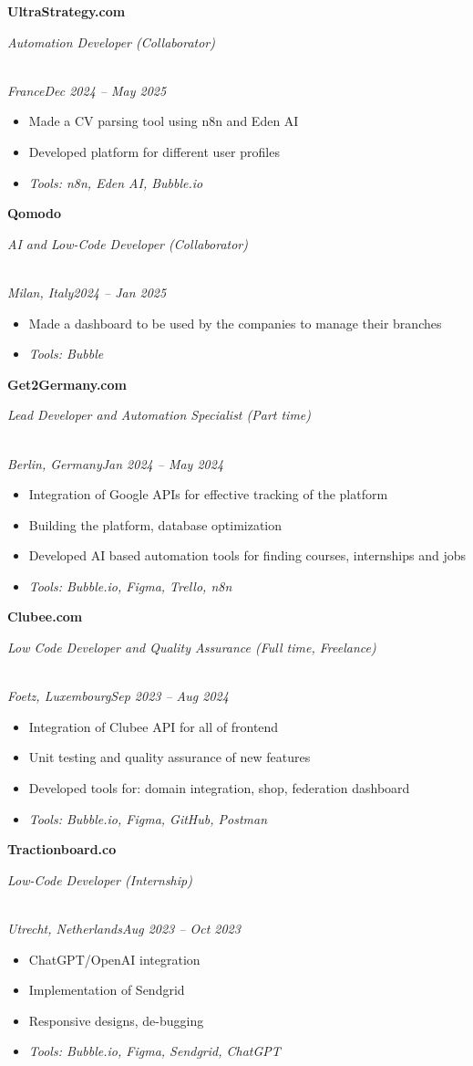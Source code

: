 \documentclass[a4paper,10pt]{article}
\newcommand{\role}[4]{\vspace{3pt}\noindent\hspace{0.6em}\parbox[t]{0.38\textwidth}{\raggedright\textbf{#1}}\hfill\parbox[t]{0.58\textwidth}{\raggedleft\textit{#2}}\\{\textit{#3}\hfill\textit{#4}}\vspace{1pt}}
\begin{document}
\role{UltraStrategy.com}{Automation Developer (Collaborator)}{France}{Dec 2024 -- May 2025}
\begin{itemize}
\item Made a CV parsing tool using n8n and Eden AI
\item Developed platform for different user profiles
\item \textit{Tools: n8n, Eden AI, Bubble.io}
\end{itemize}

\role{Qomodo}{AI and Low-Code Developer (Collaborator)}{Milan, Italy}{2024 -- Jan 2025}
\begin{itemize}
\item Made a dashboard to be used by the companies to manage their branches
\item \textit{Tools: Bubble}
\end{itemize}

\role{Get2Germany.com}{Lead Developer and Automation Specialist (Part time)}{Berlin, Germany}{Jan 2024 -- May 2024}
\begin{itemize}
\item Integration of Google APIs for effective tracking of the platform
\item Building the platform, database optimization
\item Developed AI based automation tools for finding courses, internships and jobs
\item \textit{Tools: Bubble.io, Figma, Trello, n8n}
\end{itemize}

\role{Clubee.com}{Low Code Developer and Quality Assurance (Full time, Freelance)}{Foetz, Luxembourg}{Sep 2023 -- Aug 2024}
\begin{itemize}
\item Integration of Clubee API for all of frontend
\item Unit testing and quality assurance of new features
\item Developed tools for: domain integration, shop, federation dashboard
\item \textit{Tools: Bubble.io, Figma, GitHub, Postman}
\end{itemize}

\role{Tractionboard.co}{Low-Code Developer (Internship)}{Utrecht, Netherlands}{Aug 2023 -- Oct 2023}
\begin{itemize}
\item ChatGPT/OpenAI integration
\item Implementation of Sendgrid
\item Responsive designs, de-bugging
\item \textit{Tools: Bubble.io, Figma, Sendgrid, ChatGPT}
\end{itemize}
\end{document}
